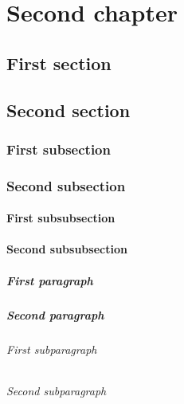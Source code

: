 \documentclass[noprint,nocopyright,baselinegrid]{uit-thesis-test}
\begin{document}
\chapter{Second chapter}
\section{First section}
\section{Second section}
\subsection{First subsection}
\subsection{Second subsection}
\subsubsection{First subsubsection}
\subsubsection{Second subsubsection}
\paragraph{First paragraph}
\paragraph{Second paragraph}
\subparagraph{First subparagraph}
\subparagraph{Second subparagraph}
\end{document}
